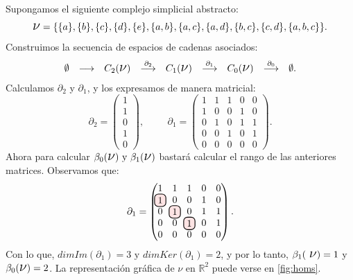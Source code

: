 \documentclass[12pt, a4paper, twoside]{book}
\newcommand\hlightr[1]{\tikz[overlay, remember picture,baseline=-
\the\dimexpr\fontdimen22\textfont2\relax]\node[rectangle,fill=red!50,rounded 
corners,fill opacity = 0.2,draw,thick,text opacity =1] {$#1$};}
\numberwithin{equation}{section}
\theoremstyle{definition}
\newenvironment{ejem}
  {\pushQED{\qed}\renewcommand{\qedsymbol}{$\blacktriangleleft$}\ejemplo}
  {\popQED\endejemplo}
\theoremstyle{remark}
\theoremstyle{plain}
\begin{document}
	\begin{ejem}
		Supongamos el siguiente complejo simplicial abstracto:
		\begin{equation*} 
			\text{{\Large $\nu$}}=\{\{a\},\{b\},\{c\},\{d\},\{e\},
			\{a,b\},\{a,c\},\{a,d\},\{b,c\},\{c,d\},\{a,b,c\}\}.
		\end{equation*}
		Construimos la secuencia de espacios de cadenas asociados:
		\begin{equation*}
			 \left.
			\begin{array}{ccccccccc}
				\emptyset & 
				\longrightarrow & C_{2}(
				\text{{\Large $\nu$}}) & 
				\overset{\partial_{2}}{
				\longrightarrow} & C_{1}(\text{{\Large $\nu$}}) 
						& \overset{\partial_{1}}{
				\longrightarrow} 
				& C_{0}(\text{{\Large $\nu$}}) & 
				\overset{\partial_{0}}{
				\longrightarrow} & \emptyset. 
			\end{array}
			\right. 
		\end{equation*}
		Calculamos $\partial_{2}$ y $\partial_{1}$, y los expresamos 
		de manera matricial:
		\begin{equation*}
			\partial_{2}=
			\begin{pmatrix}
			1 \\
			1 \\
			0 \\
			1 \\
			0
			\end{pmatrix},
			\hspace{1cm}
			\partial_{1}=
			\begin{pmatrix}
			1 & 1 & 1 & 0 & 0\\
			1 & 0 & 0 & 1 & 0\\
			0 & 1 & 0 & 1 & 1\\
			0 & 0 & 1 & 0 & 1\\
			0 & 0 & 0 & 0 & 0
			\end{pmatrix}.
		\end{equation*}
		Ahora para calcular $\beta_{0}(\text{{\Large $\nu$}}) 
		\text{ y } \beta_{1}(\text{{\Large $\nu$}})$ bastará
		calcular el rango de las anteriores matrices. Observamos que:
		\begin{equation*}
			\partial_{1}=
			\begin{pmatrix}
			1 & 1 & 1 & 0 & 0\\
			\hlightr{1} & 0 & 0 & 1 & 0\\
			0 & \hlightr{1} & 0 & 1 & 1\\
			0 & 0 & \hlightr{1} & 0 & 1\\
			0 & 0 & 0 & 0 & 0
			\end{pmatrix}.
		\end{equation*}
		Con lo que, $dimIm(\partial_{1})=3 \text{ y } 
		dimKer(\partial_{1})=2$, y por lo tanto, $\beta_{1}(\text{
		{\Large $\nu$}})=1$ y $\beta_{0}(\text{{\Large $\nu$}})=2$. La
		representación gráfica de {\Large $\nu$} en $\mathbb{R}^{2}$
		puede verse en \autoref{fig:homs}.
		

\end{ejem}
\end{document}
